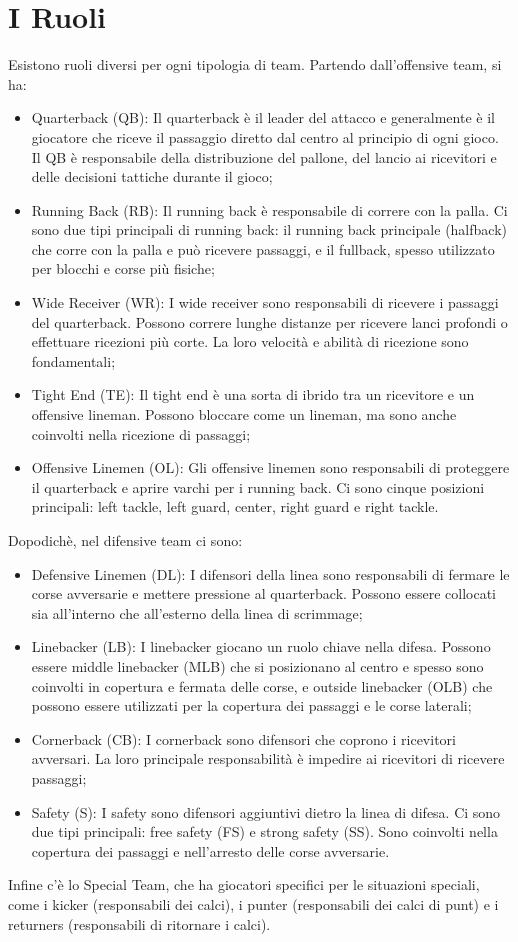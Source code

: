 \documentclass[a4paper, 12pt, oneside]{book}
\begin{document}
	\section{I Ruoli}
	Esistono ruoli diversi per ogni tipologia di team.
	Partendo dall'offensive team, si ha:
	\begin{itemize}
		\item Quarterback (QB): Il quarterback è il leader del attacco e generalmente è il giocatore che riceve il passaggio diretto dal centro al principio di ogni gioco. Il QB è responsabile della distribuzione del pallone, del lancio ai ricevitori e delle decisioni tattiche durante il gioco;
		\item Running Back (RB): Il running back è responsabile di correre con la palla. Ci sono due tipi principali di running back: il running back principale (halfback) che corre con la palla e può ricevere passaggi, e il fullback, spesso utilizzato per blocchi e corse più fisiche;
		\item Wide Receiver (WR): I wide receiver sono responsabili di ricevere i passaggi del quarterback. Possono correre lunghe distanze per ricevere lanci profondi o effettuare ricezioni più corte. La loro velocità e abilità di ricezione sono fondamentali;
		\item Tight End (TE): Il tight end è una sorta di ibrido tra un ricevitore e un offensive lineman. Possono bloccare come un lineman, ma sono anche coinvolti nella ricezione di passaggi;
		\item Offensive Linemen (OL): Gli offensive linemen sono responsabili di proteggere il quarterback e aprire varchi per i running back. Ci sono cinque posizioni principali: left tackle, left guard, center, right guard e right tackle.
	\end{itemize}
	Dopodichè, nel difensive team ci sono:
	\begin{itemize}
		\item Defensive Linemen (DL): I difensori della linea sono responsabili di fermare le corse avversarie e mettere pressione al quarterback. Possono essere collocati sia all'interno che all'esterno della linea di scrimmage;
		\item Linebacker (LB): I linebacker giocano un ruolo chiave nella difesa. Possono essere middle linebacker (MLB) che si posizionano al centro e spesso sono coinvolti in copertura e fermata delle corse, e outside linebacker (OLB) che possono essere utilizzati per la copertura dei passaggi e le corse laterali;
		\item Cornerback (CB): I cornerback sono difensori che coprono i ricevitori avversari. La loro principale responsabilità è impedire ai ricevitori di ricevere passaggi;
		\item Safety (S): I safety sono difensori aggiuntivi dietro la linea di difesa. Ci sono due tipi principali: free safety (FS) e strong safety (SS). Sono coinvolti nella copertura dei passaggi e nell'arresto delle corse avversarie.
	\end{itemize}
	Infine c'è lo Special Team, che ha giocatori specifici per le situazioni speciali, come i kicker (responsabili dei calci), i punter (responsabili dei calci di punt) e i returners (responsabili di ritornare i calci).
	
\end{document}
